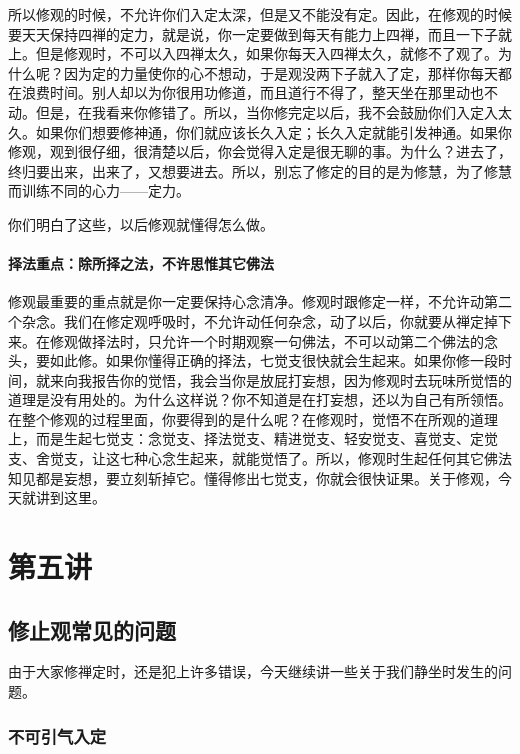 \documentclass{book}
\begin{document}
所以修观的时候，不允许你们入定太深，但是又不能没有定。因此，在修观的时候要天天保持四禅的定力，就是说，你一定要做到每天有能力上四禅，而且一下子就上。但是修观时，不可以入四禅太久，如果你每天入四禅太久，就修不了观了。为什么呢？因为定的力量使你的心不想动，于是观没两下子就入了定，那样你每天都在浪费时间。别人却以为你很用功修道，而且道行不得了，整天坐在那里动也不动。但是，在我看来你修错了。所以，当你修完定以后，我不会鼓励你们入定入太久。如果你们想要修神通，你们就应该长久入定；长久入定就能引发神通。如果你修观，观到很仔细，很清楚以后，你会觉得入定是很无聊的事。为什么？进去了，终归要出来，出来了，又想要进去。所以，别忘了修定的目的是为修慧，为了修慧而训练不同的心力——定力。

你们明白了这些，以后修观就懂得怎么做。

\subsubsection{择法重点：除所择之法，不许思惟其它佛法}

修观最重要的重点就是你一定要保持心念清净。修观时跟修定一样，不允许动第二个杂念。我们在修定观呼吸时，不允许动任何杂念，动了以后，你就要从禅定掉下来。在修观做择法时，只允许一个时期观察一句佛法，不可以动第二个佛法的念头，要如此修。如果你懂得正确的择法，七觉支很快就会生起来。如果你修一段时间，就来向我报告你的觉悟，我会当你是放屁打妄想，因为修观时去玩味所觉悟的道理是没有用处的。为什么这样说？你不知道是在打妄想，还以为自己有所领悟。在整个修观的过程里面，你要得到的是什么呢？在修观时，觉悟不在所观的道理上，而是生起七觉支：念觉支、择法觉支、精进觉支、轻安觉支、喜觉支、定觉支、舍觉支，让这七种心念生起来，就能觉悟了。所以，修观时生起任何其它佛法知见都是妄想，要立刻斩掉它。懂得修出七觉支，你就会很快证果。关于修观，今天就讲到这里。

\chapter{第五讲}

\section{修止观常见的问题}

由于大家修禅定时，还是犯上许多错误，今天继续讲一些关于我们静坐时发生的问题。

\subsection{不可引气入定}
\end{document}
